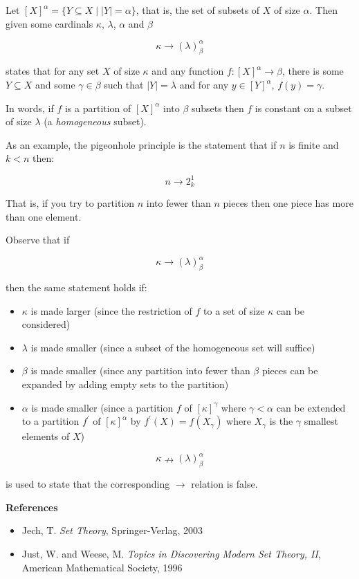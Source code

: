 \documentclass[12pt]{article}
\begin{document}
Let $[X]^\alpha=\{Y\subseteq X\mid |Y|=\alpha\}$, that is, the set of subsets of $X$ of size $\alpha$. Then given some cardinals $\kappa$, $\lambda$, $\alpha$ and $\beta$

$$ \kappa\rightarrow(\lambda)^\alpha_\beta$$

states that for any set $X$ of size $\kappa$ and any function $f:[X]^\alpha\rightarrow\beta$, there is some $Y\subseteq X$ and some $\gamma\in\beta$ such that $|Y|=\lambda$ and for any $y\in [Y]^\alpha$, $f(y)=\gamma$.

In words, if $f$ is a partition of $[X]^\alpha$ into $\beta$ subsets then $f$ is constant on a subset of size $\lambda$ (a \emph{homogeneous} subset).

As an example, the pigeonhole principle is the statement that if $n$ is finite and $k<n$ then:

$$n\rightarrow 2^1_k$$

That is, if you try to partition $n$ into fewer than $n$ pieces then one piece has more than one element.

Observe that if

$$ \kappa\rightarrow(\lambda)^\alpha_\beta$$

then the same statement holds if:
\begin{itemize}

\item $\kappa$ is made larger (since the restriction of $f$ to a set of size $\kappa$ can be considered)

\item $\lambda$ is made smaller (since a subset of the homogeneous set will suffice)

\item $\beta$ is made smaller (since any partition into fewer than $\beta$ pieces can be expanded by adding empty sets to the partition)

\item $\alpha$ is made smaller (since a partition $f$ of $[\kappa]^\gamma$ where $\gamma<\alpha$ can be extended to a partition $f^\prime$ of $[\kappa]^\alpha$ by $f^\prime(X)=f(X_\gamma)$ where $X_\gamma$ is the $\gamma$ smallest elements of $X$)

\end{itemize}

$$\kappa\nrightarrow(\lambda)^\alpha_\beta$$

is used to state that the corresponding $\rightarrow$ relation is false.


{\bf References}
\begin{itemize}
\item Jech, T.  \emph{Set Theory}, Springer-Verlag, 2003
\item Just, W. and Weese, M. \emph{Topics in Discovering Modern Set Theory, II}, American Mathematical Society, 1996
\end{itemize}
\end{document}
